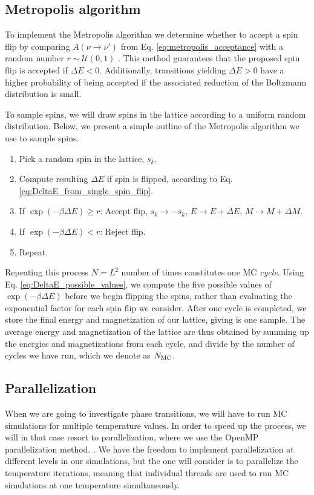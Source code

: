 \subsection{Metropolis algorithm}\label{subsec_implementations:metropolis}
To implement the Metropolis algorithm we determine whether to accept a spin flip by comparing $A(\nu\to\nu')$ from Eq. \eqref{eq:metropolis_acceptance} with a random number $r\sim \mathcal{U}(0,1)$ . This method guarantees that the proposed spin flip is accepted if $\Delta E<0$. Additionally, transitions yielding $\Delta E>0$ have a higher probability of being accepted if the associated reduction of the Boltzmann distribution is small. 

To sample spins, we will draw spins in the lattice according to a uniform random distribution. Below, we present a simple outline of the Metropolis algorithm we use to sample spins. 
\begin{enumerate}
    \item Pick a random spin in the lattice, $s_k$.
    \item Compute resulting $\Delta E$ if spin is flipped, according to Eq. \eqref{eq:DeltaE_from_single_spin_flip}.  
    \item If $\exp(-\beta\Delta E) \geq r$: Accept flip, 
    \subitem $s_k\to-s_k$, 
    \subitem $E\to E+\Delta E$, 
    \subitem$M\to M+\Delta M$. 
    \item If $\exp(-\beta\Delta E)<r$: Reject flip.
    \item Repeat.   
\end{enumerate} 
Repeating this process $N=L^2$ number of times constitutes one MC \textit{cycle}. Using Eq. \eqref{eq:DeltaE_possible_values}, we compute the five possible values of $\exp(-\beta\Delta E)$ before we begin flipping the spins, rather than evaluating the exponential factor for each spin flip we consider. After one cycle is completed, we store the final energy and magnetization of our lattice, giving is one sample. The average energy and magnetization of the lattice are thus obtained by summing up the energies and magnetizations from each cycle, and divide by the number of cycles we have run, which we denote as $N_\mathrm{MC}$. 

\subsection{Parallelization}\label{subsec_implementations:parallelization}
When we are going to investigate phase transitions, we will have to run MC simulations for multiple temperature values. In order to speed up the process, we will in that case resort to parallelization, where we use the  OpenMP parallelization method. . We have the freedom to implement parallelization at different levels in our simulations, but the one will consider is to parallelize the temperature iterations, meaning that individual threads are used to run MC simulations at one temperature simultaneously.    


